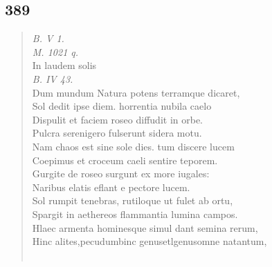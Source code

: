\documentclass[11pt, a4paper]{report}
\begin{document}
            \subsection*{}
      \begin{verse}
      \end{verse}
  
            \subsection*{389}
      \begin{verse}
      \textit{B. V 1.} \\ \textit{M. 1021 q.} \\ In laudem solis \\ \textit{B. IV 43.} \\ Dum mundum Natura potens terramque dicaret, \\ Sol dedit ipse diem. horrentia nubila caelo \\ Dispulit et faciem roseo diffudit in orbe. \\ Pulcra serenigero fulserunt sidera motu. \\ Nam chaos est sine sole dies. tum discere lucem \\ Coepimus et croceum caeli sentire teporem. \\ Gurgite  \lbrack de \rbrack  roseo surgunt ex more iugales: \\ Naribus elatis eflant e pectore lucem. \\ Sol rumpit tenebras, rutiloque ut fulet ab ortu, \\ Spargit in aethereos flammantia lumina campos. \\ Hlaec armenta hominesque simul dant semina rerum, \\ Hinc alites,pecudumbinc \lbrack genusetlgenusomne natantum, \\ 
        ﻿\pagebreak 

\end{verse}
\end{document}
